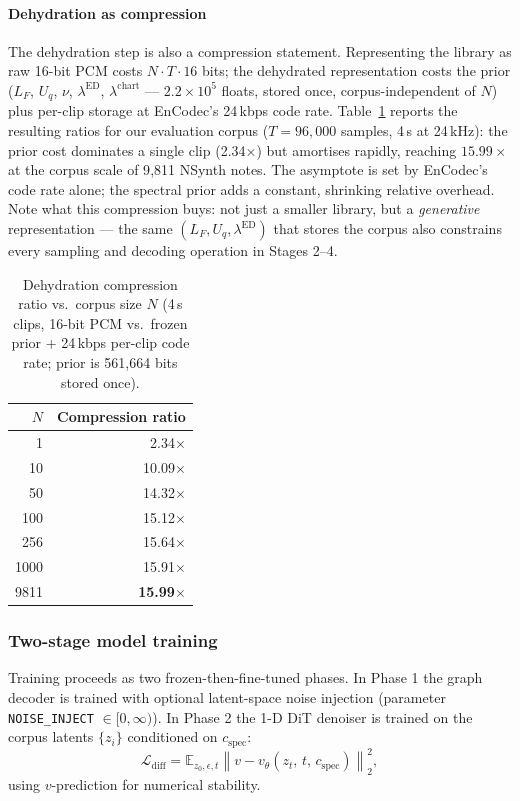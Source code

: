 \documentclass[12pt,a4paper]{article}
\begin{document}
\paragraph{Dehydration as compression}
The dehydration step is also a compression statement. Representing the
library as raw 16-bit PCM costs $N \cdot T \cdot 16$ bits; the
dehydrated representation costs the prior
($L_F$, $U_q$, $\nu$, $\lambda^{\mathrm{ED}}$, $\lambda^{\mathrm{chart}}$
— $2.2\times10^5$ floats, stored once, corpus-independent of $N$) plus
per-clip storage at EnCodec's 24\,kbps code rate. Table~\ref{tab:compression}
reports the resulting ratios for our evaluation corpus ($T = 96{,}000$
samples, 4\,s at 24\,kHz): the prior cost dominates a single clip
(2.34$\times$) but amortises rapidly, reaching $15.99\times$ at the
corpus scale of 9{,}811 NSynth notes. The asymptote is set by EnCodec's
code rate alone; the spectral prior adds a constant, shrinking relative
overhead. Note what this compression buys: not just a smaller library,
but a \emph{generative} representation — the same $(L_F, U_q,
\lambda^{\mathrm{ED}})$ that stores the corpus also constrains every
sampling and decoding operation in Stages 2--4.

\begin{table}[h]
\centering
\caption{Dehydration compression ratio vs.\ corpus size $N$
(4\,s clips, 16-bit PCM vs.\ frozen prior + 24\,kbps per-clip code
rate; prior is 561{,}664 bits stored once).}
\begin{tabular}{rr}
\toprule
$N$ & Compression ratio \\
\midrule
1 & 2.34$\times$ \\
10 & 10.09$\times$ \\
50 & 14.32$\times$ \\
100 & 15.12$\times$ \\
256 & 15.64$\times$ \\
1000 & 15.91$\times$ \\
9811 & \textbf{15.99$\times$} \\
\bottomrule
\end{tabular}
\label{tab:compression}
\end{table}

\subsubsection{Two-stage model training}

Training proceeds as two frozen-then-fine-tuned phases.
In Phase 1 the graph decoder is trained with optional latent-space noise
injection (parameter \texttt{NOISE\_INJECT} $\in [0, \infty)$).
In Phase 2 the 1-D DiT denoiser is trained on the corpus latents
$\{z_i\}$ conditioned on $c_{\mathrm{spec}}$:
\begin{equation}
  \mathcal{L}_{\mathrm{diff}}
  = \mathbb{E}_{z_0,\epsilon,t}
    \left\|v - v_\theta(z_t,\, t,\, c_{\mathrm{spec}})\right\|_2^2,
  \label{eq:diffusion_loss}
\end{equation}
using $v$-prediction for numerical stability.
\end{document}
